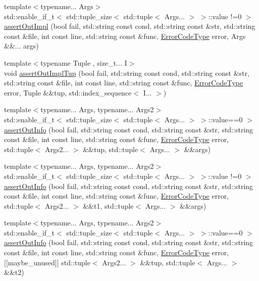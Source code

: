 \begin{DoxyCompactItemize}
\item 
{\footnotesize template$<$typename... Args$>$ }\\std\+::enable\+\_\+if\+\_\+t$<$ std\+::tuple\+\_\+size$<$ std\+::tuple$<$ Args... $>$ $>$\+::value !=0 $>$ \hyperlink{namespacevt_1_1debug_1_1assert_adcb1f71720f5961b3a6430416e95eb6b}{assert\+Out\+Impl} (bool fail, std\+::string const cond, std\+::string const \&str, std\+::string const \&file, int const line, std\+::string const \&func, \hyperlink{namespacevt_a793764d753923abc3d32929870beb485}{Error\+Code\+Type} error, Args \&\&... args)
\item 
{\footnotesize template$<$typename Tuple , size\+\_\+t... I$>$ }\\void \hyperlink{namespacevt_1_1debug_1_1assert_ab6abd4cf4f3c08bc228bb426ed920bce}{assert\+Out\+Impl\+Tup} (bool fail, std\+::string const cond, std\+::string const \&str, std\+::string const \&file, int const line, std\+::string const \&func, \hyperlink{namespacevt_a793764d753923abc3d32929870beb485}{Error\+Code\+Type} error, Tuple \&\&tup, std\+::index\+\_\+sequence$<$ I... $>$)
\item 
{\footnotesize template$<$typename... Args, typename... Args2$>$ }\\std\+::enable\+\_\+if\+\_\+t$<$ std\+::tuple\+\_\+size$<$ std\+::tuple$<$ Args... $>$ $>$\+::value==0 $>$ \hyperlink{namespacevt_1_1debug_1_1assert_ae34a8ee24e780d775c6abf3938669ffb}{assert\+Out\+Info} (bool fail, std\+::string const cond, std\+::string const \&str, std\+::string const \&file, int const line, std\+::string const \&func, \hyperlink{namespacevt_a793764d753923abc3d32929870beb485}{Error\+Code\+Type} error, std\+::tuple$<$ Args2... $>$ \&\&tup, std\+::tuple$<$ Args... $>$ \&\&args)
\item 
{\footnotesize template$<$typename... Args, typename... Args2$>$ }\\std\+::enable\+\_\+if\+\_\+t$<$ std\+::tuple\+\_\+size$<$ std\+::tuple$<$ Args... $>$ $>$\+::value !=0 $>$ \hyperlink{namespacevt_1_1debug_1_1assert_a4a74f966d45347110a86f76e821c3e7c}{assert\+Out\+Info} (bool fail, std\+::string const cond, std\+::string const \&str, std\+::string const \&file, int const line, std\+::string const \&func, \hyperlink{namespacevt_a793764d753923abc3d32929870beb485}{Error\+Code\+Type} error, std\+::tuple$<$ Args2... $>$ \&\&t1, std\+::tuple$<$ Args... $>$ \&\&args)
\item 
{\footnotesize template$<$typename... Args, typename... Args2$>$ }\\std\+::enable\+\_\+if\+\_\+t$<$ std\+::tuple\+\_\+size$<$ std\+::tuple$<$ Args... $>$ $>$\+::value==0 $>$ \hyperlink{namespacevt_1_1debug_1_1assert_a3c1f6e032dcdebf55e8d92a162589118}{assert\+Out\+Info} (bool fail, std\+::string const cond, std\+::string const \&str, std\+::string const \&file, int const line, std\+::string const \&func, \hyperlink{namespacevt_a793764d753923abc3d32929870beb485}{Error\+Code\+Type} error, \mbox{[}\mbox{[}maybe\+\_\+unused\mbox{]}\mbox{]} std\+::tuple$<$ Args2... $>$ \&\&tup, std\+::tuple$<$ Args... $>$ \&\&t2)
\end{DoxyCompactItemize}


